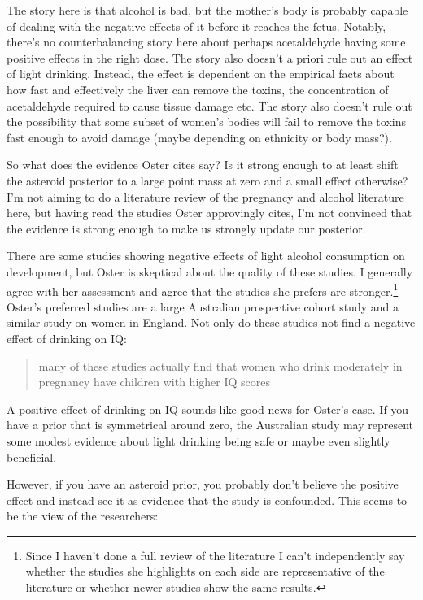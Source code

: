 \documentclass[
]{article}
\begin{document}
The story here is that alcohol is bad, but the mother's body is probably capable of dealing with the negative effects of it before it reaches the fetus. Notably, there's no counterbalancing story here about perhaps acetaldehyde having some positive effects in the right dose. The story also doesn't a priori rule out an effect of light drinking. Instead, the effect is dependent on the empirical facts about how fast and effectively the liver can remove the toxins, the concentration of acetaldehyde required to cause tissue damage etc. The story also doesn't rule out the possibility that some subset of women's bodies will fail to remove the toxins fast enough to avoid damage (maybe depending on ethnicity or body mass?).

So what does the evidence Oster cites say? Is it strong enough to at least shift the asteroid posterior to a large point mass at zero and a small effect otherwise? I'm not aiming to do a literature review of the pregnancy and alcohol literature here, but having read the studies Oster approvingly cites, I'm not convinced that the evidence is strong enough to make us strongly update our posterior.

There are some studies showing negative effects of light alcohol consumption on development, but Oster is skeptical about the quality of these studies. I generally agree with her assessment and agree that the studies she prefers are stronger.\footnote{Since I haven't done a full review of the literature I can't independently say whether the studies she highlights on each side are representative of the literature or whether newer studies show the same results.} Oster's preferred studies are a large Australian prospective cohort study and a similar study on women in England. Not only do these studies not find a negative effect of drinking on IQ:

\begin{quote}
many of these studies actually find that women who drink moderately in pregnancy have children with higher IQ scores
\end{quote}

A positive effect of drinking on IQ sounds like good news for Oster's case. If you have a prior that is symmetrical around zero, the Australian study may represent some modest evidence about light drinking being safe or maybe even slightly beneficial.

However, if you have an asteroid prior, you probably don't believe the positive effect and instead see it as evidence that the study is confounded. This seems to be the view of the researchers:
\end{document}
